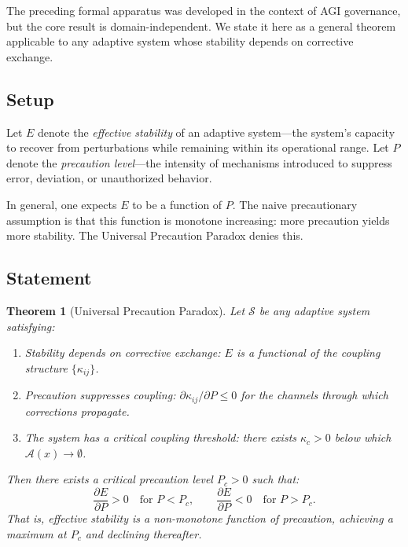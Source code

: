 \documentclass[11pt,a4paper]{article}
\theoremstyle{definition}
\theoremstyle{plain}
\newtheorem{theorem}{Theorem}
\begin{document}
The preceding formal apparatus was developed in the context of AGI governance, but the core result is domain-independent. We state it here as a general theorem applicable to any adaptive system whose stability depends on corrective exchange.

\subsection{Setup}

Let $E$ denote the \emph{effective stability} of an adaptive system---the system's capacity to recover from perturbations while remaining within its operational range. Let $P$ denote the \emph{precaution level}---the intensity of mechanisms introduced to suppress error, deviation, or unauthorized behavior.

In general, one expects $E$ to be a function of $P$. The naive precautionary assumption is that this function is monotone increasing: more precaution yields more stability. The Universal Precaution Paradox denies this.

\subsection{Statement}

\begin{theorem}[Universal Precaution Paradox]
Let $\mathcal{S}$ be any adaptive system satisfying:
\begin{enumerate}[label=(\roman*)]
\item Stability depends on corrective exchange: $E$ is a functional of the coupling structure $\{\kappa_{ij}\}$.
\item Precaution suppresses coupling: $\partial\kappa_{ij}/\partial P \leq 0$ for the channels through which corrections propagate.
\item The system has a critical coupling threshold: there exists $\kappa_c > 0$ below which $\mathcal{A}(x) \to \emptyset$.
\end{enumerate}
Then there exists a critical precaution level $P_c > 0$ such that:
\[
\frac{\partial E}{\partial P} > 0 \quad \text{for } P < P_c, \qquad
\frac{\partial E}{\partial P} < 0 \quad \text{for } P > P_c.
\]
That is, effective stability is a non-monotone function of precaution, achieving a maximum at $P_c$ and declining thereafter.
\end{theorem}
\end{document}
